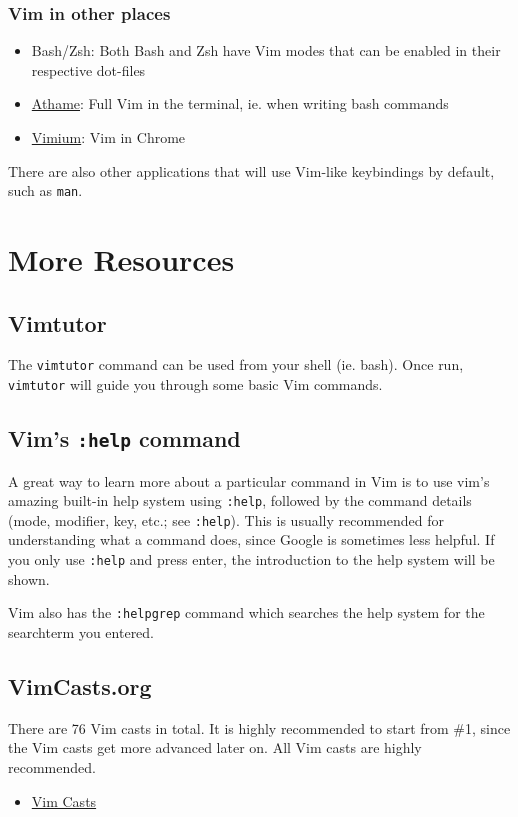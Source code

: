 \documentclass[11pt]{article}
\begin{document}
\subsubsection{Vim in other places}
\label{sec:orgeb9f094}
\begin{itemize}
\item Bash/Zsh: Both Bash and Zsh have Vim modes that can be enabled in their respective dot-files
\item \href{https://github.com/ardagnir/athame}{Athame}: Full Vim in the terminal, ie. when writing bash commands
\item \href{https://chrome.google.com/webstore/detail/vimium/dbepggeogbaibhgnhhndojpepiihcmeb}{Vimium}: Vim in Chrome
\end{itemize}

There are also other applications that will use Vim-like keybindings by default,
such as \texttt{man}.
\section{More Resources}
\label{sec:orgd82a92f}
\subsection{Vimtutor}
\label{sec:org7e60cf2}
The \texttt{vimtutor} command can be used from your shell (ie. bash). Once run,
\texttt{vimtutor} will guide you through some basic Vim commands.
\subsection{Vim's \texttt{:help} command}
\label{sec:org8c18fe2}
A great way to learn more about a particular command in Vim is to use vim's
amazing built-in help system using \texttt{:help}, followed by the command details
(mode, modifier, key, etc.; see \texttt{:help}). This is usually recommended for
understanding what a command does, since Google is sometimes less helpful.
If you only use \texttt{:help} and press enter, the introduction to the help system
will be shown.

Vim also has the \texttt{:helpgrep} command which searches the help system for the
searchterm you entered.
\subsection{VimCasts.org}
\label{sec:org8ab7498}
There are 76 Vim casts in total. It is highly recommended to start from \#1,
since the Vim casts get more advanced later on. All Vim casts are highly
recommended.
\begin{itemize}
\item \href{http://vimcasts.org/episodes/page/8/}{Vim Casts}
\end{itemize}
\end{document}
